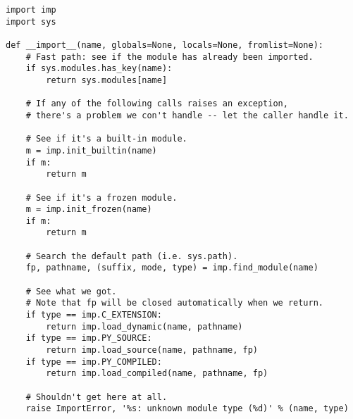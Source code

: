 \begin{verbatim}
import imp
import sys

def __import__(name, globals=None, locals=None, fromlist=None):
    # Fast path: see if the module has already been imported.
    if sys.modules.has_key(name):
        return sys.modules[name]

    # If any of the following calls raises an exception,
    # there's a problem we con't handle -- let the caller handle it.

    # See if it's a built-in module.
    m = imp.init_builtin(name)
    if m:
        return m

    # See if it's a frozen module.
    m = imp.init_frozen(name)
    if m:
        return m

    # Search the default path (i.e. sys.path).
    fp, pathname, (suffix, mode, type) = imp.find_module(name)

    # See what we got.
    # Note that fp will be closed automatically when we return.
    if type == imp.C_EXTENSION:
        return imp.load_dynamic(name, pathname)
    if type == imp.PY_SOURCE:
        return imp.load_source(name, pathname, fp)
    if type == imp.PY_COMPILED:
        return imp.load_compiled(name, pathname, fp)

    # Shouldn't get here at all.
    raise ImportError, '%s: unknown module type (%d)' % (name, type)
\end{verbatim}

